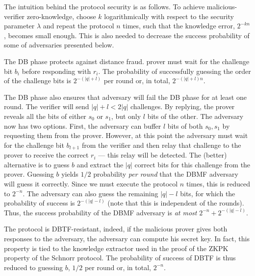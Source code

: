 The intuition behind the protocol security is as follows.
To achieve malicious-verifier zero-knowledge, choose \(k\) logarithmically with 
respect to the security parameter \(\lambda\) and repeat the protocol \(n\) 
times, such that the knowledge error, \(2^{-kn}\), becomes small enough.
This is also needed to decrease the success probability of some of adversaries 
presented below.

The \ac{DB} phase protects against distance fraud.
 prover must wait for the challenge bit \(b_i\) before responding 
with \(r_i\).
The probability of successfully guessing the order of the challenge bits is 
\(2^{-(|q|+l)}\) per round or, in total, \(2^{-(|q|+l)n}\).

The \ac{DB} phase also ensures that  adversary will fail the \ac{DB} 
phase for at least one round.
The verifier will send \(|q| + l < 2|q|\) challenges.
By replying, the prover reveals all the bits of either \(s_0\) or \(s_1\), but 
only \(l\) bits of the other.
The adversary now has two options.
First, the adversary can buffer \(l\) bits of both \(s_0, s_1\) by requesting 
them from the prover.
However, at this point the adversary must wait for the challenge bit 
\(b_{l+1}\) from the verifier and then relay that challenge to the prover to 
receive the correct \(r_i\) --- this relay will be detected.
The (better) alternative is to guess \(b\) and extract the \(|q|\) correct bits 
for this challenge from the prover.
Guessing \(b\) yields \(1/2\) probability \emph{per round} that the \ac{DBMF} 
adversary will guess it correctly.
Since we must execute the protocol \(n\) times, this is reduced to \(2^{-n}\).
The adversary can also guess the remaining \(|q|-l\) bits, for which the 
probability of success is \(2^{-(|q|-l)}\) (note that this is independent of 
the rounds).
Thus, the success probability of the \ac{DBMF} adversary is \emph{at most} 
\(2^{-n}+2^{-(|q|-l)}\).


The protocol is \ac{DBTF}-resistant, indeed, if the malicious prover gives both 
responses to the adversary, the adversary can compute his secret key.
In fact, this property is tied to the knowledge extractor used in the proof of 
the \ac{ZKPK} property of the Schnorr protocol.
The probability of success of \ac{DBTF} is thus reduced to guessing \(b\), \ie 
\(1/2\) per round or, in total, \(2^{-n}\).

